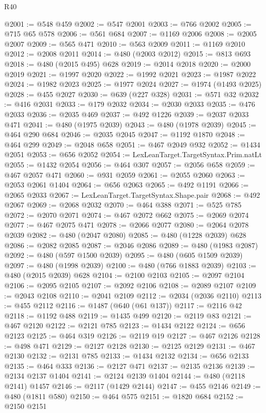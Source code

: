 \begin{lexlean}{R40}
\begin{coremodule}
@2001 := @548 @459
@2002 := @547 @2001
@2003 := @766 @2002
@2005 := @715 @65 @578
@2006 := @561 @684
@2007 := @1169 @2006
@2008 := @2005 @2007
@2009 := @565 @471
@2010 := @563 @2009
@2011 := @1169 @2010
@2012 := @2008 @2011
@2014 := @480 (@2003 @2012)
@2015 := @813 @693
@2018 := @480 (@2015 @495) @628
@2019 := @2014 @2018
@2020 := @2000 @2019
@2021 := @1997 @2020
@2022 := @1992 @2021
@2023 := @1987 @2022
@2024 := @1982 @2023
@2025 := @1977 @2024
@2027 := @1974 (@1493 @2025)
@2028 := @455 @2027
@2030 := @639 (@227 @328)
@2031 := @571 @32
@2032 := @416 @2031
@2033 := @179 @2032
@2034 := @2030 @2033
@2035 := @476 @2033
@2036 := @2035 @469
@2037 := @492 @1226
@2039 := @2037 @2033 @471
@2041 := @480 (@1975 @2039)
@2043 := @480 (@1978 @2039)
@2045 := @464 @290 @684
@2046 := @2035 @2045
@2047 := @1192 @1870
@2048 := @464 @299
@2049 := @2048 @658
@2051 := @467 @2049 @932
@2052 := @1434 @2051
@2053 := @656 @2052
@2054 := LexLeanTarget.TargetSyntax.Prim.natLt
@2055 := @1432 @2054
@2056 := @464 @307
@2057 := @2056 @658
@2059 := @467 @2057 @471
@2060 := @931 @2059
@2061 := @2055 @2060
@2063 := @2053 @2061 @1404
@2064 := @656 @2063
@2065 := @492 @1191
@2066 := @2065 @2033
@2067 := LexLeanTarget.TargetSyntax.Shape.pair
@2068 := @492 @2067
@2069 := @2068 @2032
@2070 := @464 @388
@2071 := @525 @785
@2072 := @2070 @2071
@2074 := @467 @2072 @662
@2075 := @2069 @2074
@2077 := @467 @2075 @471
@2078 := @2066 @2077
@2080 := @2064 @2078 @2039
@2082 := @480 (@2047 @2080)
@2085 := @480 (@1228 @2039) @628
@2086 := @2082 @2085
@2087 := @2046 @2086
@2089 := @480 (@1983 @2087)
@2092 := @480 (@597 @1500 @2039)
@2095 := @480 (@605 @1509 @2039)
@2097 := @480 (@1998 @2039)
@2100 := @480 (@766 @1883 @2039)
@2103 := @480 (@2015 @2039) @628
@2104 := @2100 @2103
@2105 := @2097 @2104
@2106 := @2095 @2105
@2107 := @2092 @2106
@2108 := @2089 @2107
@2109 := @2043 @2108
@2110 := @2041 @2109
@2112 := @2034 (@2036 @2110)
@2113 := @455 @2112
@2116 := @1487 (@640 (@61 @137))
@2117 := @2116 @42
@2118 := @1192 @488
@2119 := @1435 @499
@2120 := @2119 @83
@2121 := @467 @2120
@2122 := @2121 @785
@2123 := @1434 @2122
@2124 := @656 @2123
@2125 := @464 @319
@2126 := @2119 @19
@2127 := @467 @2126
@2128 := @498 @471
@2129 := @2127 @2128
@2130 := @2125 @2129
@2131 := @467 @2130
@2132 := @2131 @785
@2133 := @1434 @2132
@2134 := @656 @2133
@2135 := @464 @333
@2136 := @2127 @471
@2137 := @2135 @2136
@2139 := @2134 @2137 @1404
@2141 := @2124 @2139 @1404
@2144 := @480 (@2118 @2141) @1457
@2146 := @2117 (@1429 @2144)
@2147 := @455 @2146
@2149 := @480 (@1811 @580)
@2150 := @464 @575
@2151 := @1820 @684
@2152 := @2150 @2151

\end{coremodule}
\end{lexlean}
